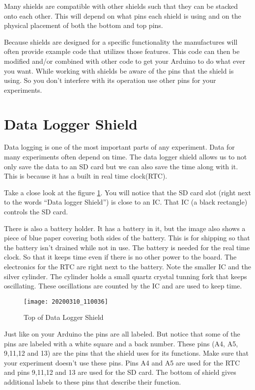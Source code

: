	Many shields are compatible with other shields such that they can be stacked onto each other. This will depend on what pins each shield is using and on the physical placement of both the bottom and top pins.
	
	Because shields are designed for a specific functionality the manufactures will often provide example code that utilizes those features. This code can then be modified and/or combined with other code to get your Arduino to do what ever you want. While working with shields be aware of the pins that the shield is using. So you don't interfere with its operation use other pins for your experiments.

\section{Data Logger Shield}
	Data logging is one of the most important parts of any experiment. Data for many experiments often depend on time. The data logger shield allows us to not only save the data to an SD card but we can also save the time along with it. This is because it has a built in real time clock(RTC). 
	
	Take a close look at the figure \ref{Data_Logger}. You will notice that the SD card slot (right next to the words ``Data logger Shield'') is close to an IC. That IC (a black rectangle) controls the SD card. 
	
	There is also a battery holder. It has a battery in it, but the image also shows a piece of blue paper covering both sides of the battery. This is for shipping so that the battery isn't drained while not in use. The battery is needed for the real time clock. So that it keeps time even if there is no other power to the board. The electronics for the RTC are right next to the battery. Note the smaller IC and the silver cylinder. The cylinder holds a small quartz crystal tunning fork that keeps oscillating. These oscillations are counted by the IC and are used to keep time. 
	\begin{figure}[h!] 
		\centering
		\caption{Top of Data Logger Shield}
		\label{Data_Logger}
		\texttt{[image: 20200310\_110036]}
	\end{figure}
	
	Just like on your Arduino the pins are all labeled. But notice that some of the pins are labeled with a white square and a back number. These pins (A4, A5, 9,11,12 and 13) are the pins that the shield uses for its functions. Make sure that your experiment doesn't use these pins. Pins A4 and A5 are used for the RTC and pins 9,11,12 and 13 are used for the SD card. The bottom of shield gives additional labels to these pins that describe their function. 



